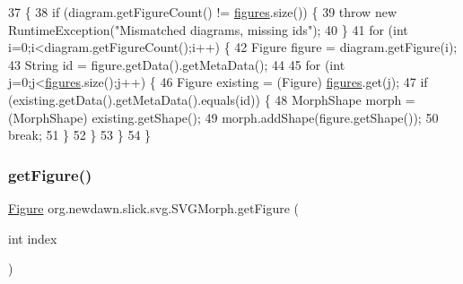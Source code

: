 \begin{DoxyCode}
37                                          \{
38         \textcolor{keywordflow}{if} (diagram.getFigureCount() != \mbox{\hyperlink{classorg_1_1newdawn_1_1slick_1_1svg_1_1_s_v_g_morph_ab3f69a342347ec5d6fa4c65aa6671e4b}{figures}}.size()) \{
39             \textcolor{keywordflow}{throw} \textcolor{keyword}{new} RuntimeException(\textcolor{stringliteral}{"Mismatched diagrams, missing ids"});
40         \}
41         \textcolor{keywordflow}{for} (\textcolor{keywordtype}{int} i=0;i<diagram.getFigureCount();i++) \{
42             Figure figure = diagram.getFigure(i);
43             String \textcolor{keywordtype}{id} = figure.getData().getMetaData();
44             
45             \textcolor{keywordflow}{for} (\textcolor{keywordtype}{int} j=0;j<\mbox{\hyperlink{classorg_1_1newdawn_1_1slick_1_1svg_1_1_s_v_g_morph_ab3f69a342347ec5d6fa4c65aa6671e4b}{figures}}.size();j++) \{
46                 Figure existing = (Figure) \mbox{\hyperlink{classorg_1_1newdawn_1_1slick_1_1svg_1_1_s_v_g_morph_ab3f69a342347ec5d6fa4c65aa6671e4b}{figures}}.get(j);
47                 \textcolor{keywordflow}{if} (existing.getData().getMetaData().equals(\textcolor{keywordtype}{id})) \{
48                     MorphShape morph = (MorphShape) existing.getShape();
49                     morph.addShape(figure.getShape());
50                     \textcolor{keywordflow}{break};
51                 \}
52             \}
53         \}
54     \}
\end{DoxyCode}
\mbox{\label{classorg_1_1newdawn_1_1slick_1_1svg_1_1_s_v_g_morph_aeef258b49ed563264f9686d542634d94}} 
\subsubsection{\texorpdfstring{get\+Figure()}{getFigure()}}
{\footnotesize\ttfamily \mbox{\hyperlink{classorg_1_1newdawn_1_1slick_1_1svg_1_1_figure}{Figure}} org.\+newdawn.\+slick.\+svg.\+S\+V\+G\+Morph.\+get\+Figure (\begin{DoxyParamCaption}\item[{int}]{index }\end{DoxyParamCaption})\hspace{0.3cm}{\ttfamily [inline]}}

